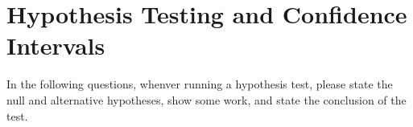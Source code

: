 \documentclass[10pt]{article}
\begin{document}
\begin{enumerate}
\end{enumerate}

\section*{Hypothesis Testing and Confidence Intervals}%

In the following questions, whenver running a hypothesis test, please state the null and alternative hypotheses, show some work, and state the conclusion of the test.
\end{document}
